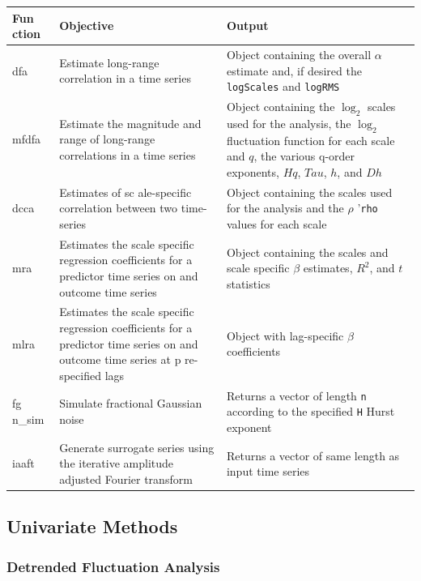 \documentclass[
  english,
  man]{apa6}
\begin{document}
\begin{longtable}[]{@{}
  >{\raggedright\arraybackslash}p{}
  >{\raggedright\arraybackslash}p{}
  >{\raggedright\arraybackslash}p{}@{}}
\toprule
Fun
ction & Objective & Output \\
\midrule
\endhead
dfa & Estimate
long-range
correlation
in a time
series & Object containing
the overall
\(\alpha\) estimate
and, if desired the
\texttt{logScales} and
\texttt{logRMS} \\
mfdfa & Estimate the
magnitude
and range of
long-range
correlations
in a time
series & Object containing
the \(\log_2\) scales
used for the
analysis, the
\(\log_2\)
fluctuation
function for each
scale and \(q\), the
various q-order
exponents, \(Hq\),
\(Tau\), \(h\), and
\(Dh\) \\
dcca & Estimates of
sc
ale-specific
correlation
between two
time-series & Object containing
the scales used for
the analysis and
the \(\rho\) '\texttt{rho\textquotesingle{}}
values for each
scale \\
mra & Estimates
the scale
specific
regression
coefficients
for a
predictor
time series
on and
outcome time
series & Object containing
the scales and
scale specific
\(\beta\) estimates,
\(R^2\), and \(t\)
statistics \\
mlra & Estimates
the scale
specific
regression
coefficients
for a
predictor
time series
on and
outcome time
series at
p
re-specified
lags & Object with
lag-specific
\(\beta\)
coefficients \\
fg
n\_sim & Simulate
fractional
Gaussian
noise & Returns a vector of
length \texttt{n}
according to the
specified \texttt{H} Hurst
exponent \\
iaaft & Generate
surrogate
series using
the
iterative
amplitude
adjusted
Fourier
transform & Returns a vector of
same length as
input time series \\
\bottomrule
\end{longtable}

\hypertarget{univariate-methods}{%
\subsection{Univariate Methods}\label{univariate-methods}}

\hypertarget{detrended-fluctuation-analysis}{%
\subsubsection{Detrended Fluctuation Analysis}\label{detrended-fluctuation-analysis}}
\end{document}
